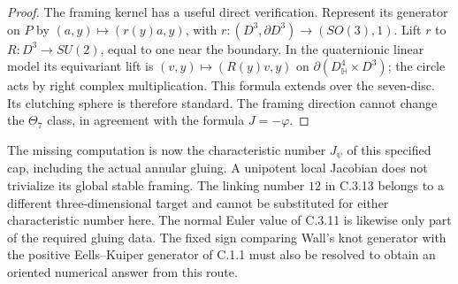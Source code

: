 \begin{proof}
The framing kernel has a useful direct verification. Represent
its generator on $P$ by
$(a,y)\mapsto(r(y)a,y)$, with
$r:(D^3,\partial D^3)\to(SO(3),1)$. Lift $r$ to
$R:D^3\to SU(2)$, equal to one near the boundary. In the
quaternionic linear model its equivariant lift is
$(v,y)\mapsto(R(y)v,y)$ on
$\partial(D^4_{\mathbb H}\times D^3)$; the circle acts by
right complex multiplication. This formula extends over the
seven-disc. Its clutching sphere is therefore standard.
The framing direction cannot change the $\Theta_7$ class,
in agreement with the formula $J=-\varphi$.
\end{proof}

\begin{remark}
The missing computation is now the characteristic number
$J_\psi$ of this specified cap, including the actual annular
gluing. A unipotent local Jacobian does not trivialize its global
stable framing. The linking number $12$ in C.3.13 belongs to
a different three-dimensional target and cannot be substituted
for either characteristic number here. The normal Euler value
of C.3.11 is likewise only part of the required gluing data.
The fixed sign comparing Wall's knot generator with the positive
Eells--Kuiper generator of C.1.1 must also be resolved to obtain
an oriented numerical answer from this route.
\end{remark}
